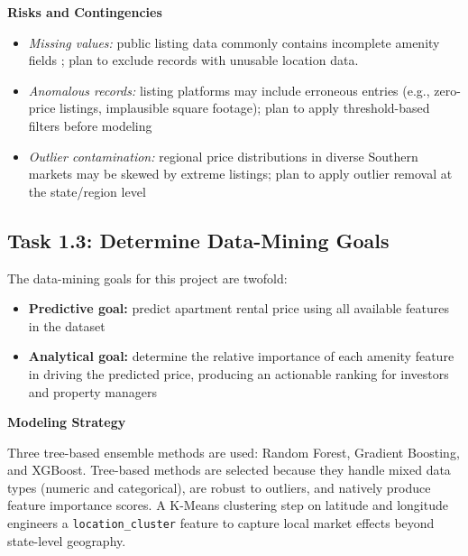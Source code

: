 \vspace{-9pt}
\noindent
\textbf{Risks and Contingencies}
\vspace{-9pt}
\begin{itemize}[itemsep=-9pt]
    \item \textit{Missing values:} public listing data commonly contains incomplete amenity fields%
    ; plan to %
    exclude records with unusable location data.
    \item \textit{Anomalous records:} listing platforms may include erroneous entries (e.g., zero-price listings, implausible square footage); plan to apply threshold-based filters before modeling
    \item \textit{Outlier contamination:} regional price distributions in diverse Southern markets may be skewed by extreme listings; plan to apply outlier removal at the state/region level %
\end{itemize}

\subsection*{Task 1.3: Determine Data-Mining Goals}

The data-mining goals for this project are twofold:
\vspace{-12pt}
\begin{itemize}[itemsep=-9pt]
    \item \textbf{Predictive goal:} predict apartment rental price using all available features in the dataset
    \item \textbf{Analytical goal:} determine the relative importance of each amenity feature in driving the predicted price, producing an actionable ranking for investors and property managers
\end{itemize}

\medskip\noindent
\textbf{Modeling Strategy}

Three tree-based ensemble methods are used: Random Forest, Gradient Boosting, and XGBoost. Tree-based methods are selected because they handle mixed data types (numeric and categorical), are robust to outliers, and natively produce feature importance scores. A K-Means clustering step on latitude and longitude %
engineers a \texttt{location\_cluster} feature to capture local market effects beyond state-level geography.

